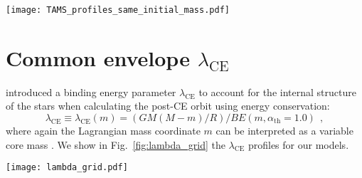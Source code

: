 \documentclass[twocolumn,twocolappendix,trackchanges]{aastex63}
\DeclareRobustCommand{\Figref}[1]{Fig.~\ref{#1}}
\begin{document}
\begin{figure*}[htbp]
  \centering
  \texttt{[image: TAMS\_profiles\_same\_initial\_mass.pdf]}
  \caption{Specific entropy (top row), H (bottom row, solid lines),
    and He (bottom row, dashed lines) profiles for non-rotating single
    stars (red), accretors (orange), and ``engineered'' models of the
    same total mass as the ZAMS mass of the accretors. The overlapping
    gray bands emphasize the CEB region.}
  \label{fig:TAMS_profiles_same_initial_mass}
\end{figure*}


\section{Common envelope $\lambda_\mathrm{CE}$}
\label{sec:pop_synth_app}

\cite{dekool:1990} introduced a binding energy parameter
$\lambda_\mathrm{CE}$ to account for the internal structure of the
stars when calculating the post-CE orbit using energy conservation:
\begin{equation}
  \label{eq:lambda}
  \lambda_\mathrm{CE} \equiv \lambda_\mathrm{CE}(m) = (GM(M-m)/R)/BE(m, \alpha_\mathrm{th}=1.0) \ \ ,
\end{equation}
where again the Lagrangian mass coordinate $m$ can be interpreted as a
variable core mass \citep[see also][]{demarco:11, ivanova:2013}. We show
in \Figref{fig:lambda_grid} the $\lambda_\mathrm{CE}$ profiles for our models.

\begin{figure*}[htbp]
  \centering
  \texttt{[image: lambda\_grid.pdf]}
  \caption{Profile of the binding energy parameter
    $\lambda_\mathrm{CE}$ as a function of mass coordinate for
    accretors (orange), single stars (red), and our engineered stars
    (other colors) at selected total radii. The vertical dashed lines
    mark $M_\mathrm{He}$, that is the outermost location where
    $X<0.01$ and $Y>0.1$.}
  \label{fig:lambda_grid}
\end{figure*}



\end{document}
